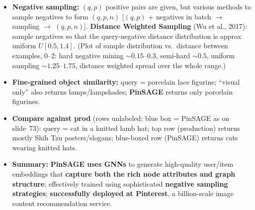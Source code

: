\begin{itemize}
  \item \textbf{Negative sampling:} $(q,p)$ positive pairs are given, but
    various methods to sample negatives to form $(q,p,n)$ [$(q,p)$ + negatives
    in batch $\to$ sampling $\to$ $(q,p,n)$]. \textbf{Distance Weighted
    Sampling} (Wu et al., 2017): sample negatives so that the query-negative
    distance distribution is approx uniform $U[0.5,1.4]$. (Plot of sample
    distribution vs.\ distance between examples, 0--2: hard negative mining
    ${\sim}0.15$--$0.3$, semi-hard ${\sim}0.5$, uniform sampling
    ${\sim}1.25$--$1.75$, distance weighted spread over the whole range.)
  \item \textbf{Fine-grained object similarity:} query = porcelain lace
    figurine; ``visual only'' also returns lamps/lampshades; \textbf{PinSAGE}
    returns only porcelain figurines.
  \item \textbf{Compare against prod} (rows unlabeled; blue box = PinSAGE as
    on slide~73): query = cat in a knitted lamb hat; top row (production)
    returns mostly Shih Tzu posters/slogans; blue-boxed row (PinSAGE) returns
    cats wearing knitted hats.
  \item \textbf{Summary:} \textbf{PinSAGE uses GNNs} to generate high-quality
    user/item embeddings that \textbf{capture both the rich node attributes and
    graph structure}; effectively trained using sophisticated \textbf{negative
    sampling strategies}; \textbf{successfully deployed at Pinterest}, a
    billion-scale image content recommendation service.
\end{itemize}

